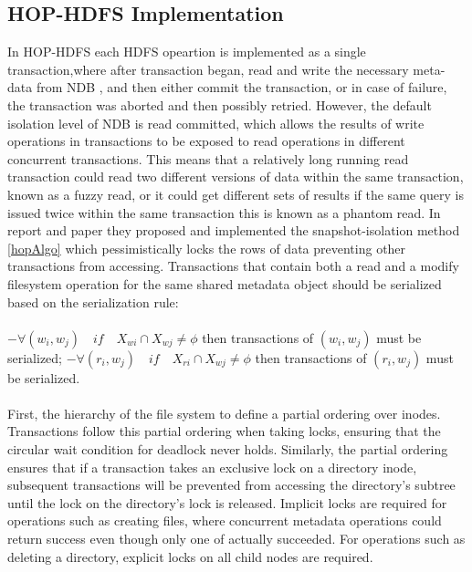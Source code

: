 \subsection{HOP-HDFS Implementation}
In HOP-HDFS each HDFS opeartion is implemented as a single transaction,where after transaction began, read and write the necessary meta-data from NDB , and then either commit the transaction, or in case of failure, the transaction was aborted and then possibly retried. However,  the  default  isolation  level  of  NDB  is   read  committed,  which  allows   the  results   of
write  operations   in  transactions   to  be  exposed  to  read  operations   in  different  concurrent
transactions.  This   means   that  a  relatively   long  running  read  transaction  could  read  two
different  versions   of  data  within  the  same  transaction,  known  as  a fuzzy  read, or it could get
different  sets   of  results   if the same query  is  issued twice within the same transaction  this  is
known as a phantom read. In report\cite{12} and paper \cite{hoppaper} they proposed and implemented the snapshot-isolation method \ref{hopAlgo} which pessimistically locks the rows of data preventing other transactions from accessing. 
Transactions that contain both a read and a modify filesystem operation for the same shared metadata object should be serialized based on the serialization rule:\\\\
$ -\forall(w_{i},w_{j}) \hspace{1em} if \hspace{1em} X_{wi}\cap X_{wj} \neq \phi$ then transactions of $ (w_{i},w_{j})$ must be serialized; $
-\forall(r_{i},w_{j})  \hspace{1em} if \hspace{1em} X_{ri}\cap X_{wj} \neq \phi$ then transactions of $(r_{i},w_{j})$  must be serialized.\\\\
First, the hierarchy of the file system to define a partial ordering over
inodes. Transactions follow this partial ordering when taking locks, ensuring
that the circular wait condition for deadlock never holds. Similarly, the partial
ordering ensures that if a transaction takes an exclusive lock on a directory inode,
subsequent transactions will be prevented from accessing the directory's subtree
until the lock on the directory's lock is released. Implicit locks are required for
operations such as creating files, where concurrent metadata operations could
return success even though only one of actually succeeded. For operations such
as deleting a directory, explicit locks on all child nodes are required.

